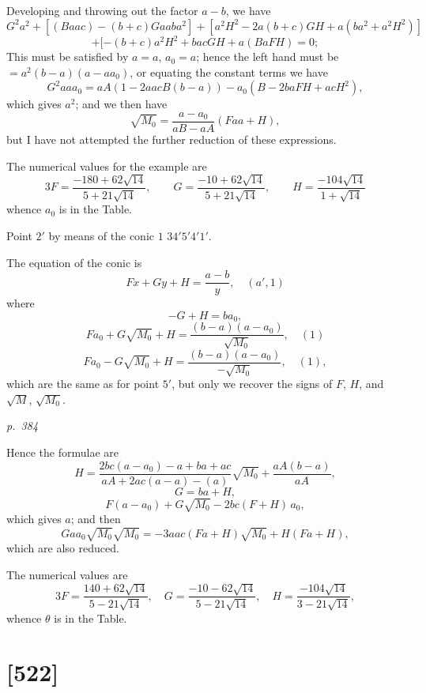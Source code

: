 \documentclass[11pt,a4paper]{book}
\begin{document}
Developing and throwing out the factor $a - b$, we have
\[
G^2 a^2
+ [(B a a c) - (b + c) G a a b a^2]
+ [a^2 H^2 - 2 a(b + c) G H + a(b a^2 + a^2 H^2)]
\]
\[
+ [-(b + c)a^2 H^2 + b a c G H + a(B aFH) = 0;
\]
This must be satisfied by $a = a$, $a_0 = a$; hence the left hand must be $= a^2 (b - a)(a - a a_0)$,
or equating the constant terms we have
\[
G^2 a a a_0 = a A (1 - 2 a a c B (b - a)) - a_0 (B - 2 b a F H + a c H^2),
\]
which gives $a^2$; and we then have
\[
\sqrt{M_0} = \frac{a - a_0}{a B - a A}\left(F a a + H\right),
\]
but I have not attempted the further reduction of these expressions.

The numerical values for the example are
\[
3 F = \frac{-180 + 62 \sqrt{14}}{5 + 21 \sqrt{14}}, \qquad G = \frac{-10 + 62 \sqrt{14}}{5 + 21 \sqrt{14}}, \qquad H = \frac{-104 \sqrt{14}}{1 + \sqrt{14}}
\]
whence $a_0$ is in the Table.

Point $2'$ by means of the conic $1$ $34'5'4'1'$.

The equation of the conic is
\[
F x + G y + H = \frac{a - b}{y}, \quad (a', 1)
\]
where
\[
- G + H = b a_0,
\]
\[
F a_0 + G \sqrt{M_0} + H = \frac{(b - a)(a - a_0)}{\sqrt{M_0}}, \quad (1)
\]
\[
F a_0 - G \sqrt{M_0} + H = \frac{(b - a)(a - a_0)}{- \sqrt{M_0}}, \quad (1),
\]
which are the same as for point $5'$, but only we recover the signs of $F$, $H$, and $\sqrt{M}$, $\sqrt{M_0}$.

\clearpage

\bigskip
\textit{p.~384}
\smallskip

\noindent
Hence the formulae are
\[
H = \frac{2 b c (a - a_0) - a + b a + a c}{aA + 2 a c (a - a) - (a)}\sqrt{M_0} + \frac{a A (b - a)}{aA},
\]
\[
G = b a + H,
\]
\[
F(a - a_0) + G \sqrt{M_0} - 2 b c (F + H)\,a_0,
\]
which gives $a$; and then
\[
G a a_0 \sqrt{M_0} \sqrt{M_0} = -3 a a c \left(F a + H\right)\sqrt{M_0} + H\left(F a + H\right),
\]
which are also reduced.

The numerical values are
\[
3 F = \frac{140 + 62 \sqrt{14}}{5 - 21 \sqrt{14}}, \quad G = \frac{-10 - 62 \sqrt{14}}{5 - 21 \sqrt{14}}, \quad H = \frac{-104 \sqrt{14}}{3 - 21 \sqrt{14}},
\]
whence $\theta$ is in the Table.

\clearpage

\section{[522]}
\end{document}
